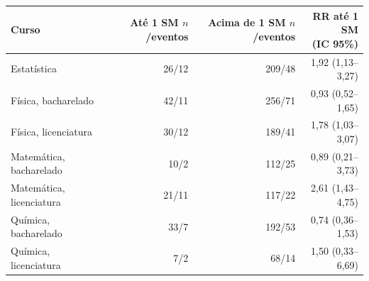 \begin{tabular}{lrrr}
\toprule
Curso & \makecell[r]{Até 1 SM\\$n$/eventos} & \makecell[r]{Acima de 1 SM\\$n$/eventos} & \makecell[r]{RR até 1 SM\\(IC 95\%)} \\
\midrule
Estatística & 26/12 & 209/48 & 1,92 (1,13--3,27) \\
Física, bacharelado & 42/11 & 256/71 & 0,93 (0,52--1,65) \\
Física, licenciatura & 30/12 & 189/41 & 1,78 (1,03--3,07) \\
Matemática, bacharelado & 10/2 & 112/25 & 0,89 (0,21--3,73) \\
Matemática, licenciatura & 21/11 & 117/22 & 2,61 (1,43--4,75) \\
Química, bacharelado & 33/7 & 192/53 & 0,74 (0,36--1,53) \\
Química, licenciatura & 7/2 & 68/14 & 1,50 (0,33--6,69) \\
\bottomrule
\end{tabular}
